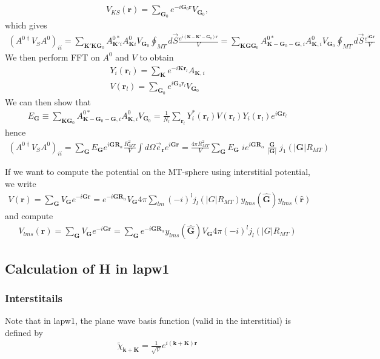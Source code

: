 \documentclass[aps,prb,floatfix,epsfig,singlecolumn,showpacs,preprintnumbers]{revtex4}
\newcommand{\vR}{{\mathbf{R}}}
\renewcommand{\vr}{{\mathbf{r}}}
\newcommand{\vk}{{\mathbf{k}}}
\newcommand{\vK}{{\mathbf{K}}}
\newcommand{\vG}{{\mathbf{G}}}
\begin{document}
\begin{eqnarray}
V_{KS}(\vr) = \sum_{\vG_0} e^{-i\vG_0 \vr}V_{\vG_0},
\end{eqnarray}
which gives
\begin{eqnarray}
(A^{0\dagger} V_S A^0)_{ii} =
\sum_{\vK'\vK\vG_0} A^{0*}_{\vK' i} A^0_{\vK i} V_{\vG_0} \oint_{MT} d\vec{S}  \frac{e^{i(\vK-\vK'-\vG_0)\vr}}{V} =
\sum_{\vK\vG\vG_0} A^{0*}_{\vK-\vG_0-\vG, i} A^0_{\vK, i} V_{\vG_0} \oint_{MT} d\vec{S}  \frac{e^{i\vG\vr}}{V}
\end{eqnarray}
We then perform FFT on $A^0$ and $V$ to obtain
\begin{eqnarray}
Y_i(\vr_l) = \sum_\vK e^{-i\vK\vr_l} A_{\vK,i}\\
V(\vr_l) = \sum_{\vG_0} e^{i\vG_0\vr_l} V_{\vG_0}
\end{eqnarray}
We can then show that
\begin{eqnarray}
E_{\vG}\equiv \sum_{\vK\vG_0} A^{0*}_{\vK-\vG_0-\vG, i} A^0_{\vK, i}
  V_{\vG_0} =\frac{1}{N_l}\sum_{\vr_l} Y^*_i(\vr_l) V(\vr_l)
  Y_i(\vr_l) e^{i \vG\vr_l}
\end{eqnarray}
hence
\begin{eqnarray}
(A^{0\dagger} V_S A^0)_{ii} =
\sum_{\vG} E_{\vG} e^{i\vG\vR_\alpha} \frac{R_{MT}^2}{V}
\int d\Omega \vec{e}_\vr  e^{i\vG\vr} =
\frac{4\pi R_{MT}^2}{V} \sum_{\vG}E_\vG\; i e^{i\vG\vR_\alpha}\;
\frac{\vG}{|\vG|} \; j_1(|\vG|R_{MT})
\end{eqnarray}

If we want to compute the potential on the MT-sphere using
interstitial potential, we write
\begin{eqnarray}
V(\vr) = \sum_\vG V_\vG e^{-i\vG\vr} = e^{-i\vG\vR_\alpha} V_\vG 4\pi
 \sum_{lm} (-i)^l j_l(|G|R_{MT}) y_{lms}(\hat{\vG}) y_{lms}(\hat{\vr})
\end{eqnarray}
and compute
\begin{eqnarray}
V_{lms}(\vr) = \sum_\vG V_\vG e^{-i\vG\vr} = \sum_\vG e^{-i\vG\vR_\alpha} y_{lms}(\hat{\vG}) V_\vG 4\pi (-i)^l j_l(|G|R_{MT}) 
\end{eqnarray}

\subsection{Calculation of H in lapw1}
\subsubsection{Interstitails}

Note that in lapw1, the plane wave basis function (valid in the interstitial) is defined by
\begin{eqnarray}
\tilde{\chi}_{\vk+\vK} = \frac{1}{\sqrt{V}}e^{i(\vk+\vK)\vr}
\end{eqnarray}
\end{document}
